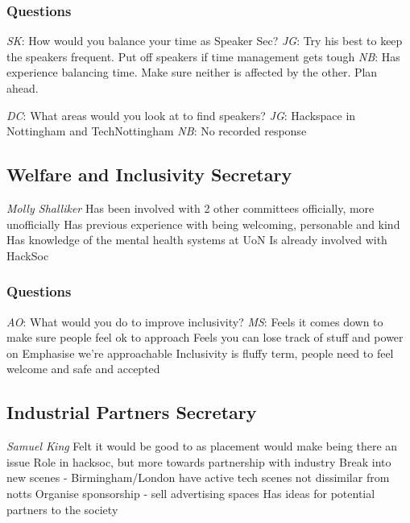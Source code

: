 \documentclass[11pt]{meetingmins}
\begin{document}
\subsubsection{Questions}
\begin{items}
	\item
	\textit{SK}: How would you balance your time as Speaker Sec?
		\subitem
		\textit{JG}:
			\subsubitem
			Try his best to keep the speakers frequent. 
			\subsubitem
			Put off speakers if time management gets tough
		\subitem
		\textit{NB}:
			\subsubitem
			Has experience balancing time.
			\subsubitem
			Make sure neither is affected by the other.
			\subsubitem
			Plan ahead.
			
	\item
	\textit{DC}: What areas would you look at to find speakers?
		\subitem
		\textit{JG}:
			\subsubitem
			Hackspace in Nottingham and TechNottingham
		\subitem
		\textit{NB}:
			\subsubitem
			No recorded response
\end{items}


\subsection{Welfare and Inclusivity Secretary}
\begin{items}
	\item
	\textit{Molly Shalliker}
		\subitem
		Has been involved with 2 other committees officially, more unofficially
		\subitem
		Has previous experience with being welcoming, personable and kind
		\subitem
		Has knowledge of the mental health systems at UoN
		\subitem
		Is already involved with HackSoc	
\end{items}

\subsubsection{Questions}
\begin{items}
	\item
	\textit{AO}: What would you do to improve inclusivity?
		\subitem
		\textit{MS}:
			\subsubitem
			Feels it comes down to make sure people feel ok to approach
			\subsubitem
			Feels you can lose track of stuff and power on
			\subsubitem
			Emphasise we're approachable
			\subsubitem
			Inclusivity is fluffy term, people need to feel welcome and safe and accepted
\end{items}


\subsection{Industrial Partners Secretary}
\begin{items}
	\item
	\textit{Samuel King}
		\subitem
		Felt it would be good to as placement would make being there an issue
		\subitem
		Role in hacksoc, but more towards partnership with industry
		\subitem
		Break into new scenes - Birmingham/London have active tech scenes not dissimilar from notts
		\subitem
		Organise sponsorship - sell advertising spaces
		\subitem
		Has ideas for potential partners to the society
\end{items}
\end{document}
